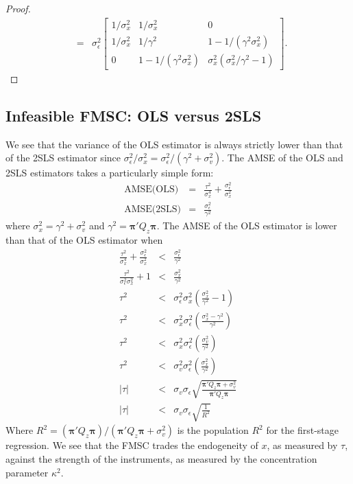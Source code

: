 \documentclass[12pt]{article}\usepackage[]{graphicx}\usepackage[]{color}
\theoremstyle{definition}
\begin{document}
\begin{proof}
\begin{eqnarray*}
  &=& \sigma_\epsilon^2 \left[ \begin{array}{ccc}
  1/\sigma_x^2 & 1/\sigma_x^2 & 0\\
  1/\sigma_x^2 & 1/\gamma^2 & 1 - 1/(\gamma^2\sigma_x^2)\\
  0& 1 - 1/(\gamma^2 \sigma_x^2) & \sigma_x^2(\sigma_x^2/\gamma^2 - 1)
  \end{array}\right].
    \end{eqnarray*}
\end{proof}

\subsection{Infeasible FMSC: OLS versus 2SLS}
We see that the variance of the OLS estimator is always strictly lower than that of the 2SLS estimator since $\sigma^2_\epsilon/\sigma_x^2 = \sigma^2_\epsilon/(\gamma^2 + \sigma_v^2)$. The AMSE of the OLS and 2SLS estimators takes a particularly simple form:
  \begin{eqnarray}
  \mbox{AMSE(OLS)} &=& \frac{\tau^2}{\sigma_x^4} + \frac{\sigma_\epsilon^2}{\sigma_x^2}\\
  \mbox{AMSE(2SLS)} &=& \frac{\sigma_\epsilon^2}{\gamma^2}
  \end{eqnarray}
where $\sigma_x^2 = \gamma^2 + \sigma_v^2$ and $\gamma^2 = \boldsymbol{\pi}'Q_z \boldsymbol{\pi}$. The AMSE of the OLS estimator is lower than that of the OLS estimator when
  \begin{eqnarray*}
    \frac{\tau^2}{\sigma_x^4} + \frac{\sigma_\epsilon^2}{\sigma_x^2} &<& \frac{\sigma_\epsilon^2}{\gamma^2}\\
    \frac{\tau^2}{\sigma_\epsilon^2\sigma_x^2} + 1&<&\frac{\sigma_x^2}{\gamma^2}\\
    \tau^2 &<&\sigma_\epsilon^2\sigma_x^2\left(\frac{\sigma_x^2}{\gamma^2} - 1\right)\\
        \tau^2  &<& \sigma_x^2 \sigma_\epsilon^2\left(\frac{\sigma_x^2 - \gamma^2}{\gamma^2}\right)\\
        \tau^2  &<& \sigma_x^2 \sigma_\epsilon^2\left(\frac{\sigma_v^2}{\gamma^2}\right)\\
                \tau^2  &<& \sigma_v^2 \sigma_\epsilon^2\left(\frac{\sigma_x^2}{\gamma^2}\right)\\
              |\tau|  &<& \sigma_v \sigma_\epsilon\sqrt{\frac{\mathbf{\pi}'Q_z \mathbf{\pi} + \sigma_v^2}{\mathbf{\pi}'Q_z \mathbf{\pi}}}\\
              |\tau|  &<& \sigma_v \sigma_\epsilon \sqrt{\frac{1}{R^2}}
  \end{eqnarray*}
Where $R^2 = (\boldsymbol{\pi}'Q_z \boldsymbol{\pi})/(\boldsymbol{\pi}'Q_z \boldsymbol{\pi} + \sigma_v^2)$ is the population $R^2$ for the first-stage regression. We see that the FMSC trades the endogeneity of $x$, as measured by $\tau$, against the strength of the instruments, as measured by the concentration parameter $\kappa^2$. 
\end{document}

